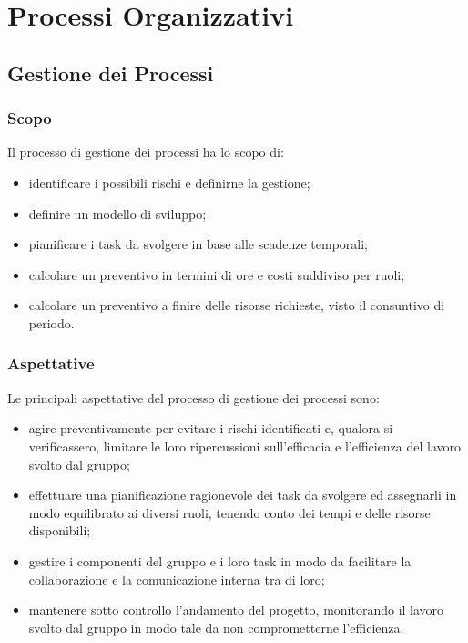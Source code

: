 \section{Processi Organizzativi}

\subsection{Gestione dei Processi}

	\subsubsection{Scopo}
	
		Il processo di gestione dei processi ha lo scopo di:
		
		\begin{itemize}
			\item identificare i possibili rischi e definirne la gestione;
			\item definire un modello di sviluppo;
			\item pianificare i task da svolgere in base alle scadenze temporali;
			\item calcolare un preventivo in termini di ore e costi suddiviso per ruoli; 
			\item calcolare un preventivo a finire delle risorse richieste, visto il consuntivo di periodo.
		\end{itemize}
		
	\subsubsection{Aspettative}
		
		Le principali aspettative del processo di gestione dei processi sono:
	
		\begin{itemize}
			\item agire preventivamente per evitare i rischi identificati e, qualora si verificassero, limitare le loro ripercussioni sull'efficacia e l'efficienza del lavoro svolto dal gruppo;
			\item effettuare una pianificazione ragionevole dei task da svolgere ed assegnarli in modo equilibrato ai diversi ruoli, tenendo conto dei tempi e delle risorse disponibili;
			\item gestire i componenti del gruppo e i loro task in modo da facilitare la collaborazione e la comunicazione interna tra di loro;
			\item mantenere sotto controllo l'andamento del progetto, monitorando il lavoro svolto dal gruppo in modo tale da non comprometterne l'efficienza.
		\end{itemize}
	
